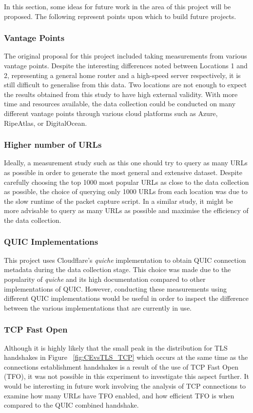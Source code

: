 \documentclass{l4proj}
\begin{document}
In this section, some ideas for future work in the area of this project will be proposed. The following represent points upon which to build future projects.

\subsubsection{Vantage Points} The original proposal for this project included taking measurements from various vantage points. Despite the interesting differences noted between Locations 1 and 2, representing a general home router and a high-speed server respectively, it is still difficult to generalise from this data. Two locations are not enough to expect the results obtained from this study to have high external validity. With more time and resources available, the data collection could be conducted on many different vantage points through various cloud platforms such as Azure, RipeAtlas, or DigitalOcean.

\subsubsection{Higher number of URLs} Ideally, a measurement study such as this one should try to query as many URLs as possible in order to generate the most general and extensive dataset. Despite carefully choosing the top 1000 most popular URLs as close to the data collection as possible, the choice of querying only 1000 URLs from each location was due to the slow runtime of the packet capture script. In a similar study, it might be more advisable to query as many URLs as possible and maximise the efficiency of the data collection.

\subsubsection{QUIC Implementations} This project uses Cloudflare's \emph{quiche} implementation to obtain QUIC connection metadata during the data collection stage. This choice was made due to the popularity of \emph{quiche} and its high documentation compared to other implementations of QUIC. However, conducting these measurements using different QUIC implementations would be useful in order to inspect the difference between the various implementations that are currently in use.

\subsubsection{TCP Fast Open} Although it is highly likely that the small peak in the distribution for TLS handshakes in Figure ~\ref{fig:CEvsTLS_TCP} which occurs at the same time as the connections establishment handshakes is a result of the use of TCP Fast Open (TFO), it was not possible in this experiment to investigate this aspect further. It would be interesting in future work involving the analysis of TCP connections to examine how many URLs have TFO enabled, and how efficient TFO is when compared to the QUIC combined handshake.
\end{document}
